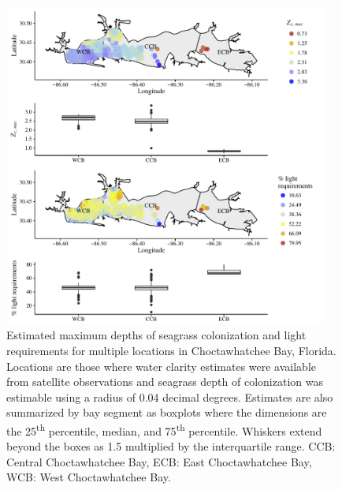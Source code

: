 \documentclass[letterpaper,12pt,oneside]{article}\usepackage[]{graphicx}\usepackage[]{color}
\begin{document}

\begin{figure}
\centering
\includegraphics[width = 0.95\textwidth]{figs/light_choc.pdf}
\caption{Estimated maximum depths of seagrass colonization and light requirements for multiple locations in Choctawhatchee Bay, Florida. Locations are those where water clarity estimates were available from satellite observations and seagrass depth of colonization was estimable using a radius of 0.04 decimal degrees.  Estimates are also summarized by bay segment as boxplots where the dimensions are the 25\textsuperscript{th} percentile, median, and 75\textsuperscript{th} percentile.  Whiskers extend beyond the boxes as 1.5 multiplied by the interquartile range. CCB: Central Choctawhatchee Bay, ECB: East Choctawhatchee Bay, WCB: West Choctawhatchee Bay.}
\label{fig:light_choc}
\end{figure}

\end{document}
